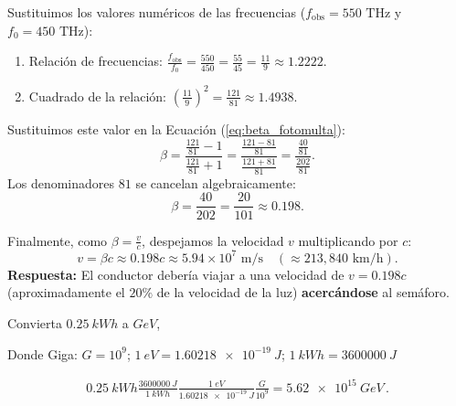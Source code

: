 \documentclass[12pt, a4paper]{article}
\begin{document}
\begin{solution}
    Sustituimos los valores numéricos de las frecuencias ($f_{\text{obs}} = 550 \text{ THz}$ y $f_0 = 450 \text{ THz}$):
    \begin{enumerate}
        \item Relación de frecuencias: $\frac{f_{\text{obs}}}{f_0} = \frac{550}{450} = \frac{55}{45} = \frac{11}{9} \approx 1.2222$.
        \item Cuadrado de la relación: $\left(\frac{11}{9}\right)^2 = \frac{121}{81} \approx 1.4938$.
    \end{enumerate}
    Sustituimos este valor en la Ecuación (\ref{eq:beta_fotomulta}):
    \begin{equation}
        \beta = \frac{\frac{121}{81} - 1}{\frac{121}{81} + 1} = \frac{\frac{121 - 81}{81}}{\frac{121 + 81}{81}} = \frac{\frac{40}{81}}{\frac{202}{81}}.
    \end{equation}
    Los denominadores $81$ se cancelan algebraicamente:
    \begin{equation}
        \beta = \frac{40}{202} = \frac{20}{101} \approx 0.198.
    \end{equation}
    
    Finalmente, como $\beta = \frac{v}{c}$, despejamos la velocidad $v$ multiplicando por $c$:
    \begin{equation}
        v = \beta c \approx 0.198c \approx 5.94 \times 10^7 \text{ m/s} \quad (\approx 213,840 \text{ km/h}).
    \end{equation}
    \textbf{Respuesta:} El conductor debería viajar a una velocidad de $v = 0.198c$ (aproximadamente el $20\%$ de la velocidad de la luz) \textbf{acercándose} al semáforo.
\end{solution}


\begin{exercise}[ID=kwh, subtitle={De kilovatios hora a gigaelectronvoltios}, tags={banco}]
Convierta $\qty{0.25}{kWh}$ a $\unit{GeV}$,

Donde Giga: $\unit{G}=10^9$;  $\qty{1}{eV} = \qty{1.60218e-19}{J}$;  $\qty{1}{kWh} =\qty{3600000}{J}$

\vspace{10cm}
\end{exercise}
\begin{solution}
\begin{align*}
        \qty{0.25}{kWh}\frac{\qty{3600000}{J}}{\qty{1}{kWh}}\frac{\qty{1}{eV} }{\qty{1.60218e-19}{J}}
        \frac{\unit{G}}{10^9}=\qty{5.62e+15}{GeV}\,.
    \end{align*}
\end{solution}
\end{document}

